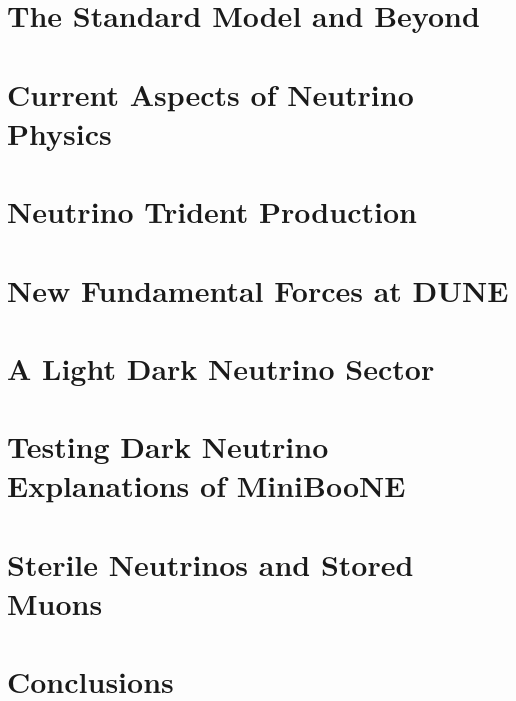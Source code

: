 \documentclass[openany,twoside,frontopenright,chaprunninghead]{ip3thesis}
\begin{document}
\chapter{The Standard Model and Beyond}


\chapter{Current Aspects of Neutrino Physics}
% 


\chapter{Neutrino Trident Production}


\chapter{New Fundamental Forces at DUNE}


\chapter{A Light Dark Neutrino Sector}


\chapter{Testing Dark Neutrino Explanations of MiniBooNE }


\chapter{Sterile Neutrinos and Stored Muons}


\chapter{Conclusions}

\end{document}

